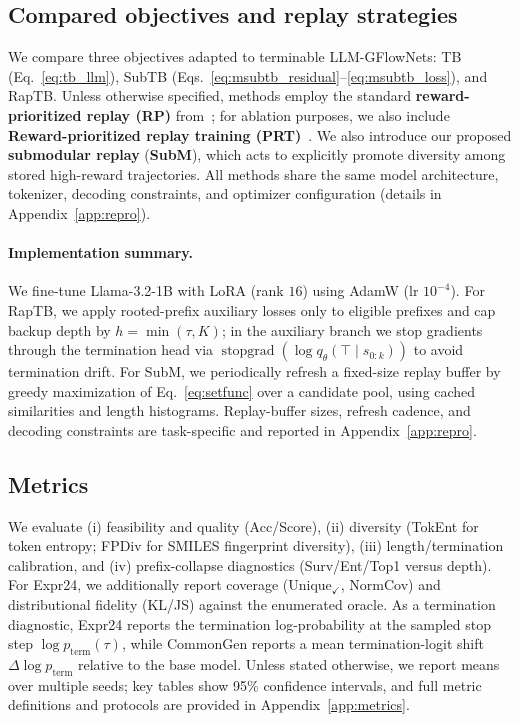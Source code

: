 \documentclass{article}
\newcommand{\sg}[1]{\operatorname{stopgrad}\!\left(#1\right)}
\theoremstyle{plain}
\theoremstyle{definition}
\theoremstyle{remark}
\begin{document}
\subsection{Compared objectives and replay strategies}
\label{sec:baselines}

We compare three objectives adapted to terminable LLM-GFlowNets: TB (Eq.~\ref{eq:tb_llm}), SubTB (Eqs.~\ref{eq:msubtb_residual}--\ref{eq:msubtb_loss}), and RapTB. Unless otherwise specified, methods employ the standard \textbf{reward-prioritized replay (RP)} from~\citet{hu2024amortizing}; for ablation purposes, we also include \textbf{Reward-prioritized replay training (PRT)}~\citep{pmlr-v202-shen23a}. We also introduce our proposed \textbf{submodular replay} (\textbf{SubM}), which acts to explicitly promote diversity among stored high-reward trajectories. All methods share the same model architecture, tokenizer, decoding constraints, and optimizer configuration (details in Appendix~\ref{app:repro}).

\paragraph{Implementation summary.}
We fine-tune Llama-3.2-1B with LoRA (rank $16$) using AdamW (lr $10^{-4}$).
For RapTB, we apply rooted-prefix auxiliary losses only to eligible prefixes and cap backup depth by $h=\min(\tau,K)$; in the auxiliary branch we stop gradients through the termination head via $\sg{\log q_\theta(\top\mid s_{0:k})}$ to avoid termination drift.
For SubM, we periodically refresh a fixed-size replay buffer by greedy maximization of Eq.~\ref{eq:setfunc} over a candidate pool, using cached similarities and length histograms.
Replay-buffer sizes, refresh cadence, and decoding constraints are task-specific and reported in Appendix~\ref{app:repro}.

\subsection{Metrics}
\label{sec:metrics}

We evaluate (i) feasibility and quality (Acc/Score), (ii) diversity (TokEnt for token entropy; FPDiv for SMILES fingerprint diversity), (iii) length/termination calibration, and (iv) prefix-collapse diagnostics (Surv/Ent/Top1 versus depth). For Expr24, we additionally report coverage (Unique$_\checkmark$, NormCov) and distributional fidelity (KL/JS) against the enumerated oracle. As a termination diagnostic, Expr24 reports the termination log-probability at the sampled stop step $\log p_{\mathrm{term}}(\tau)$, while CommonGen reports a mean termination-logit shift $\Delta\log p_{\mathrm{term}}$ relative to the base model. Unless stated otherwise, we report means over multiple seeds; key tables show 95\% confidence intervals, and full metric definitions and protocols are provided in Appendix~\ref{app:metrics}.
\end{document}
